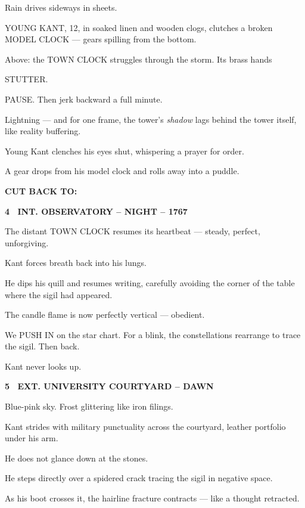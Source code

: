 \documentclass[12pt]{article}
\newcommand{\scene}[2]{%
  \vspace{1.8\baselineskip}%
  \noindent\textbf{#1 \ #2}\par\vspace{0.4\baselineskip}%
}
\newcommand{\transition}[1]{%
  \vspace{0.6\baselineskip}%
  \begin{flushright}\textbf{#1}\end{flushright}%
}
\newcommand{\centered}[1]{%
  \vspace{0.8\baselineskip}%
  \begin{center}#1\end{center}%
}
\begin{document}
Rain drives sideways in sheets.

YOUNG KANT, 12, in soaked linen and wooden clogs, clutches a broken
MODEL CLOCK --- gears spilling from the bottom.

Above: the TOWN CLOCK struggles through the storm. Its brass hands

\centered{STUTTER.}

PAUSE. Then jerk backward a full minute.

Lightning --- and for one frame, the tower's \emph{shadow} lags behind the
tower itself, like reality buffering.

Young Kant clenches his eyes shut, whispering a prayer for order.

A gear drops from his model clock and rolls away into a puddle.

\transition{CUT BACK TO:}


\scene{4}{INT. OBSERVATORY -- NIGHT -- 1767}

The distant TOWN CLOCK resumes its heartbeat --- steady, perfect,
unforgiving.

Kant forces breath back into his lungs.

He dips his quill and resumes writing, carefully avoiding the corner of
the table where the sigil had appeared.

The candle flame is now perfectly vertical --- obedient.

We PUSH IN on the star chart. For a blink, the constellations rearrange
to trace the sigil. Then back.

Kant never looks up.


\scene{5}{EXT. UNIVERSITY COURTYARD -- DAWN}

Blue-pink sky. Frost glittering like iron filings.

Kant strides with military punctuality across the courtyard, leather
portfolio under his arm.

He does not glance down at the stones.

He steps directly over a spidered crack tracing the sigil in negative
space.

As his boot crosses it, the hairline fracture contracts --- like a
thought retracted.
\end{document}
